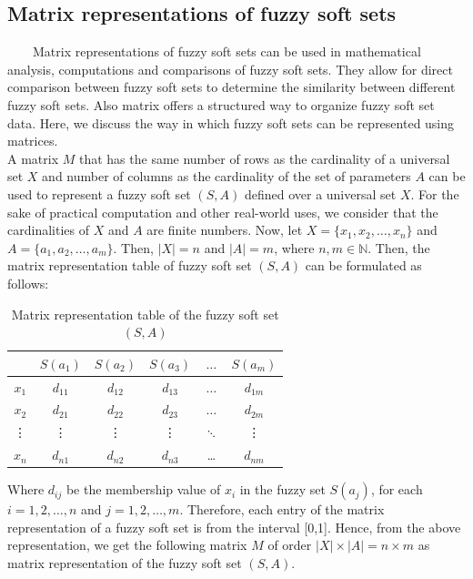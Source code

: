 \documentclass{article}
\theoremstyle{definition}
\begin{document}
\subsection{Matrix representations of fuzzy soft sets}

~~~~Matrix representations of fuzzy soft sets can be used in mathematical analysis, computations and comparisons of fuzzy soft sets. They allow for direct comparison between fuzzy soft sets to determine the similarity between different fuzzy soft sets. Also matrix offers a structured way to organize fuzzy soft set data. Here, we discuss the way in which fuzzy soft sets can be represented using matrices.\\

  A matrix $M$ that has the same number of rows as the cardinality of a universal set $X$ and number of columns as the cardinality of the set of parameters $A$ can be used to represent a fuzzy soft set $(S,A)$ defined over a universal set $X$. For the sake of practical computation and other real-world uses, we consider that the cardinalities of $X$ and $A$ are finite numbers. Now, let $X=\{x_1, x_2,\dots, x_n\}$ and $A=\{a_1, a_2, \dots, a_m\}$. Then, $|X|=n$ and $|A|=m$, where $n, m \in \mathbb{N}$. Then, the matrix representation table of fuzzy soft set $(S,A)$ can be formulated as follows:

  \begin{table}[h]
\begin{center}
\begin{tabular}{c|c c c c c}
& $S(a_1)$ & $S(a_2)$ & $S(a_3)$ & $\dots$ & $S(a_m)$\\
\hline
$x_1$ & $d_{11}$ & $d_{12}$ & $d_{13}$ & $\dots$ & $d_{1m}$\\
$x_2$ & $d_{21}$ & $d_{22}$ & $d_{23}$ & $\dots$ & $d_{2m}$\\
\vdots & \vdots & \vdots & \vdots & $\ddots$ & \vdots\\
$x_n$  & $d_{n1}$ & $d_{n2}$ &  $d_{n3}$ & \dots & $d_{nm}$

\end{tabular}
\end{center} 
\caption{\label{tab1}Matrix representation table of the fuzzy soft set $(S,A)$}
\end{table}

    Where $d_{ij}$ be the membership value of $x_i$ in the fuzzy set $S(a_j)$, for each $i=1,2,\dots, n$ and $j=1,2,\dots, m$. Therefore, each entry of the matrix representation of a fuzzy soft set is from the interval [0,1]. Hence, from the above representation, we get the following matrix $M$ of order $|X|\times |A|=n\times m$ as  matrix representation of the fuzzy soft set $(S,A)$. 
    
\end{document}
